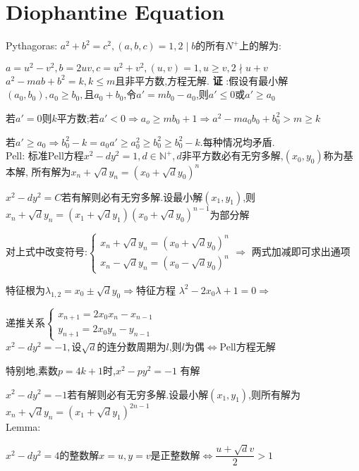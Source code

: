 \section{Diophantine Equation} 
Pythagoras: $ a^2+b^2=c^2,(a,b,c)=1,2\mid b$的所有$ N^{+}$上的解为:

$ a=u^2-v^2,b=2uv,c=u^2+v^2,(u,v)=1,u\ge v,2 \nmid u+v$
\\

$ a^2-mab+b^2=k,k\le m$且非平方数,方程无解.
{\bf 证 }:假设有最小解$ (a_0,b_0),a_0\ge b_0,$且$ a_0+b_0$,令$ a'=mb_0-a_0$,则$ a'\le 0$或$ a' \ge a_0$

若$ a'=0$则$ k$平方数;若$ a'<0\Rightarrow a_o\ge mb_0+1\Rightarrow a^2-ma_0b_0+b_0^2>m\ge k$

若$ a'\ge a_0\Rightarrow b_0^2-k=a_0a'\ge a_0^2\ge b_0^2\ge b_0^2-k$.每种情况均矛盾.
\\

Pell:
标准Pell方程$ x^2-dy^2=1,d\in \mathbb{N^{+}},d$非平方数必有无穷多解,$ (x_0,y_0)$称为基本解,
所有解为$ x_n+\sqrt{d}y_n=(x_0+\sqrt{d}y_0)^n$

$ x^2-dy^2=C$若有解则必有无穷多解.设最小解$ (x_1,y_1)$,则$ x_n+\sqrt{d}y_n=(x_1+\sqrt{d}y_1)(x_0+\sqrt{d}y_0)^{n-1}$为部分解

对上式中改变符号:$
\begin{cases}
x_n+\sqrt{d}y_n=(x_0+\sqrt{d}y_0)^n \\
x_n-\sqrt{d}y_n=(x_0-\sqrt{d}y_0)^n   
\end{cases}  \Rightarrow	$
两式加减即可求出通项

特征根为$ \lambda_{1,2}=x_0\pm\sqrt{d}y_0\Rightarrow $特征方程
$ \lambda^2-2x_0\lambda+1=0\Rightarrow$ 

递推关系$ \begin{cases} x_{n+1}=2x_0x_n-x_{n-1}\\ y_{n+1}=2x_0y_n-y_{n-1}\end{cases}$
\\

$ x^2-dy^2=-1,$设$ \sqrt{d}$的连分数周期为$ l$,则$ l$为偶$ \Leftrightarrow $Pell方程无解

特别地,素数$ p=4k+1$时,$ x^2-py^2=-1$	有解

$ x^2-dy^2=-1$若有解则必有无穷多解.设最小解$ (x_1,y_1)$,则所有解为$ x_n+\sqrt{d}y_n=(x_1+\sqrt{d}y_1)^{2n-1}$
\\

Lemma:

$ x^2-dy^2=4$的整数解$ x=u,y=v$是正整数解$ \Leftrightarrow \dfrac{u+\sqrt{d}v}{2}>1$

